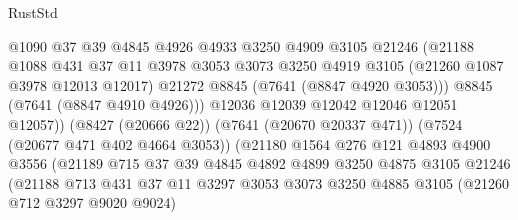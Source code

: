 \begin{lexlean}{RustStd}
\begin{coremodule}
                                @1090
                                @37
                                @39
                                @4845
                                @4926
                                @4933
                                @3250
                                @4909
                                @3105
                                @21246
                                (@21188
                                  @1088
                                  @431
                                  @37
                                  @11
                                  @3978
                                  @3053
                                  @3073
                                  @3250
                                  @4919
                                  @3105
                                  (@21260 @1087 @3978 @12013 @12017)
                                  @21272
                                  @8845
                                  (@7641 (@8847 @4920 @3053)))
                                @8845
                                (@7641 (@8847 @4910 @4926)))
                              @12036
                              @12039
                              @12042
                              @12046
                              @12051
                              @12057))
                          (@8427 (@20666 @22))
                          (@7641 (@20670 @20337 @471))
                          (@7524 (@20677 @471 @402 @4664 @3053))
                          (@21180
                            @1564
                            @276
                            @121
                            @4893
                            @4900
                            @3556
                            (@21189
                              @715
                              @37
                              @39
                              @4845
                              @4892
                              @4899
                              @3250
                              @4875
                              @3105
                              @21246
                              (@21188
                                @713
                                @431
                                @37
                                @11
                                @3297
                                @3053
                                @3073
                                @3250
                                @4885
                                @3105
                                (@21260 @712 @3297 @9020 @9024)

\end{coremodule}
\end{lexlean}
